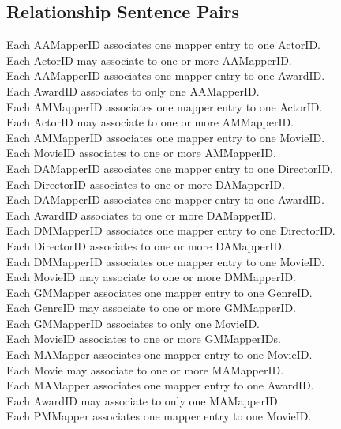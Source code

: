 \documentclass[letterpaper,12pt]{article}
\begin{document}
\subsection{Relationship Sentence Pairs}
Each AAMapperID associates one mapper entry to one ActorID.\\
Each ActorID may associate to one or more AAMapperID.
\\
Each AAMapperID associates one mapper entry to one AwardID.\\
Each AwardID associates to only one AAMapperID.
\\
Each AMMapperID associates one mapper entry to one ActorID.\\
Each ActorID may associate to one or more AMMapperID.
\\
Each AMMapperID associates one mapper entry to one MovieID.\\
Each MovieID associates to one or more AMMapperID.
\\
Each DAMapperID associates one mapper entry to one DirectorID.\\
Each DirectorID associates to one or more DAMapperID.
\\
Each DAMapperID associates one mapper entry to one AwardID.\\
Each AwardID associates to one or more DAMapperID.
\\
Each DMMapperID associates one mapper entry to one DirectorID.\\
Each DirectorID associates to one or more DAMapperID.
\\
Each DMMapperID associates one mapper entry to one MovieID.\\
Each MovieID may associate to one or more DMMapperID.
\\
Each GMMapper associates one mapper entry to one GenreID.\\
Each GenreID may associate to one or more GMMapperID.
\\
Each GMMapperID associates to only one MovieID.\\
Each MovieID associates to one or more GMMapperIDs.
\\
Each MAMapper associates one mapper entry to one MovieID.\\
Each Movie may associate to one or more MAMapperID.
\\
Each MAMapper associates one mapper entry to one AwardID.\\
Each AwardID may associate to only one MAMapperID.
\\
Each PMMapper associates one mapper entry to one MovieID.\\
\end{document}
